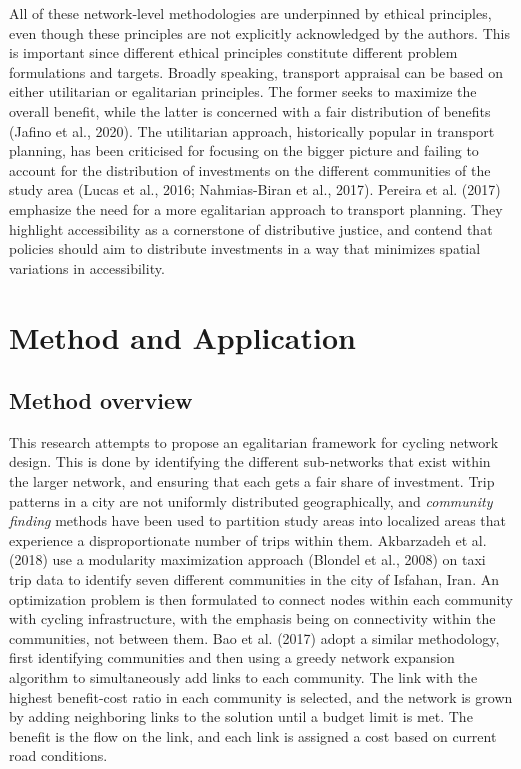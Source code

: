 \documentclass[
]{article}
\begin{document}
All of these network-level methodologies are underpinned by ethical principles, even though these principles are not explicitly acknowledged by the authors.
This is important since different ethical principles constitute different problem formulations and targets.
Broadly speaking, transport appraisal can be based on either utilitarian or egalitarian principles.
The former seeks to maximize the overall benefit, while the latter is concerned with a fair distribution of benefits (Jafino et al., 2020).
The utilitarian approach, historically popular in transport planning, has been criticised for focusing on the bigger picture and failing to account for the distribution of investments on the different communities of the study area (Lucas et al., 2016; Nahmias-Biran et al., 2017).
Pereira et al. (2017) emphasize the need for a more egalitarian approach to transport planning.
They highlight accessibility as a cornerstone of distributive justice, and contend that policies should aim to distribute investments in a way that minimizes spatial variations in accessibility.

\hypertarget{method-and-application}{%
\section{Method and Application}\label{method-and-application}}

\hypertarget{method-overview}{%
\subsection{Method overview}\label{method-overview}}

This research attempts to propose an egalitarian framework for cycling network design.
This is done by identifying the different sub-networks that exist within the larger network, and ensuring that each gets a fair share of investment.
Trip patterns in a city are not uniformly distributed geographically, and \emph{community finding} methods have been used to partition study areas into localized areas that experience a disproportionate number of trips within them.
Akbarzadeh et al. (2018) use a modularity maximization approach (Blondel et al., 2008) on taxi trip data to identify seven different communities in the city of Isfahan, Iran.
An optimization problem is then formulated to connect nodes within each community with cycling infrastructure, with the emphasis being on connectivity within the communities, not between them.
Bao et al. (2017) adopt a similar methodology, first identifying communities and then using a greedy network expansion algorithm to simultaneously add links to each community.
The link with the highest benefit-cost ratio in each community is selected, and the network is grown by adding neighboring links to the solution until a budget limit is met.
The benefit is the flow on the link, and each link is assigned a cost based on current road conditions.
\end{document}
